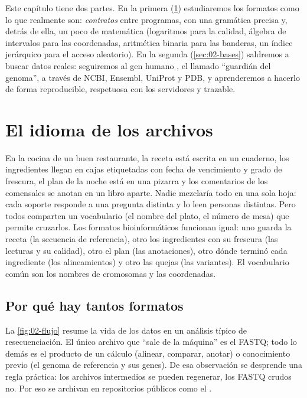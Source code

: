 Este capítulo tiene dos partes. En la primera (\cref{sec:02-formatos}) estudiaremos los formatos como lo que realmente son: \emph{contratos} entre programas, con una gramática precisa y, detrás de ella, un poco de matemática (logaritmos para la calidad, álgebra de intervalos para las coordenadas, aritmética binaria para las banderas, un índice jerárquico para el acceso aleatorio). En la segunda (\cref{sec:02-bases}) saldremos a buscar datos reales: seguiremos al gen humano , el llamado ``guardián del genoma'', a través de NCBI, Ensembl, UniProt y PDB, y aprenderemos a hacerlo de forma reproducible, respetuosa con los servidores y trazable.

\section{El idioma de los archivos}\label{sec:02-formatos}

\begin{intuicion}
En la cocina de un buen restaurante, la receta está escrita en un cuaderno, los ingredientes llegan en cajas etiquetadas con fecha de vencimiento y grado de frescura, el plan de la noche está en una pizarra y los comentarios de los comensales se anotan en un libro aparte. Nadie mezclaría todo en una sola hoja: cada soporte responde a una pregunta distinta y lo leen personas distintas. Pero todos comparten un vocabulario (el nombre del plato, el número de mesa) que permite cruzarlos. Los formatos bioinformáticos funcionan igual: uno guarda la receta (la secuencia de referencia), otro los ingredientes con su frescura (las lecturas y su calidad), otro el plan (las anotaciones), otro dónde terminó cada ingrediente (los alineamientos) y otro las quejas (las variantes). El vocabulario común son los nombres de cromosomas y las coordenadas.
\end{intuicion}

\subsection{Por qué hay tantos formatos}

La \cref{fig:02-flujo} resume la vida de los datos en un análisis típico de resecuenciación. El único archivo que ``sale de la máquina'' es el FASTQ; todo lo demás es el producto de un cálculo (alinear, comparar, anotar) o conocimiento previo (el genoma de referencia y sus genes). De esa observación se desprende una regla práctica: los archivos intermedios se pueden regenerar, los FASTQ crudos no. Por eso se archivan en repositorios públicos como el  \parencite{c02-leinonen2011}.

